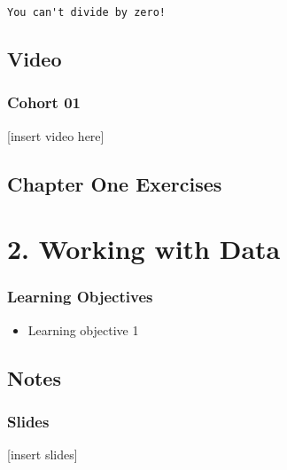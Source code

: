 \documentclass[
  letterpaper,
  DIV=11,
  numbers=noendperiod]{scrreprt}
\newenvironment{Shaded}{\begin{snugshade}}{\end{snugshade}}
\providecommand{\tightlist}{%
  \setlength{\itemsep}{0pt}\setlength{\parskip}{0pt}}
\begin{document}
\begin{Shaded}
\begin{Highlighting}[]
\begin{verbatim}
You can't divide by zero!
\end{verbatim}

\hypertarget{video}{%
\chapter*{Video}\label{video}}

\hypertarget{cohort-01}{%
\section*{Cohort 01}\label{cohort-01}}

{[}insert video here{]}

\hypertarget{chapter-one-exercises}{%
\chapter{Chapter One Exercises}\label{chapter-one-exercises}}

\part{2. Working with Data}

\hypertarget{learning-objectives-1}{%
\section*{Learning Objectives}\label{learning-objectives-1}}

\begin{itemize}
\tightlist
\item
  Learning objective 1
\end{itemize}

\hypertarget{notes}{%
\chapter*{Notes}\label{notes}}

\hypertarget{slides}{%
\section*{Slides}\label{slides}}

{[}insert slides{]}


\end{Highlighting}
\end{Shaded}
\end{document}
